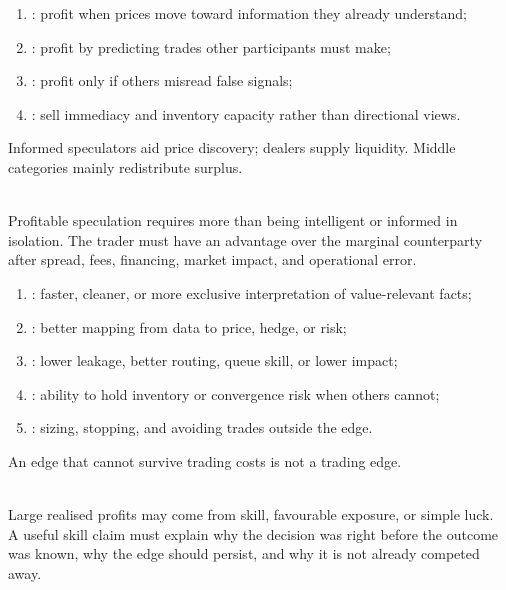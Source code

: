 \begin{taxonomy} 
\begin{enumerate}[label=\roman*.]
\setlength{\itemsep}{0pt}
\item {}: profit when prices move toward information they already understand;
\item {}: profit by predicting trades other participants must make;
\item {}: profit only if others misread false signals;
\item {}: sell immediacy and inventory capacity rather than directional views.
\end{enumerate}
Informed speculators aid price discovery; dealers supply liquidity. Middle categories mainly redistribute surplus.
\end{taxonomy}

\begin{principle} \\
Profitable speculation requires more than being intelligent or informed in isolation. The trader must have an advantage over the marginal counterparty after spread, fees, financing, market impact, and operational error.
\end{principle}

\begin{taxonomy} 
\begin{enumerate}[label=\roman*.]
\setlength{\itemsep}{0pt}
\item {}: faster, cleaner, or more exclusive interpretation of value-relevant facts;
\item {}: better mapping from data to price, hedge, or risk;
\item {}: lower leakage, better routing, queue skill, or lower impact;
\item {}: ability to hold inventory or convergence risk when others cannot;
\item {}: sizing, stopping, and avoiding trades outside the edge.
\end{enumerate}
An edge that cannot survive trading costs is not a trading edge.
\end{taxonomy}

\begin{caveat} \\
Large realised profits may come from skill, favourable exposure, or simple luck.\\
A useful skill claim must explain why the decision was right before the outcome was known, why the edge should persist, and why it is not already competed away.
\end{caveat}

